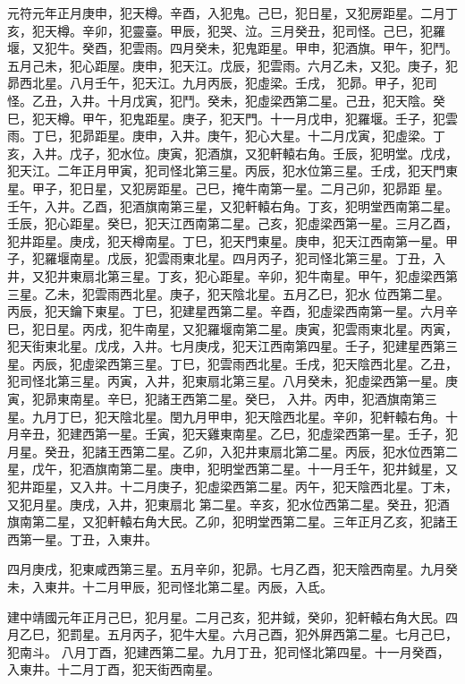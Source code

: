 \begin{pinyinscope}
 元符元年正月庚申，犯天樽。辛酉，入犯鬼。己巳，犯日星，又犯房距星。二月丁亥，犯天樽。辛卯，犯靈臺。甲辰，犯哭、泣。三月癸丑，犯司怪。己巳，犯羅堰，又犯牛。癸酉，犯雲雨。四月癸未，犯鬼距星。甲申，犯酒旗。甲午，犯鬥。五月己未，犯心距屋。庚申，犯天江。戊辰，犯雲雨。六月乙未，又犯。庚子，犯昴西北星。八月壬午，犯天江。九月丙辰，犯虛梁。壬戌，
 犯昴。甲子，犯司怪。乙丑，入井。十月戊寅，犯鬥。癸未，犯虛梁西第二星。己丑，犯天陰。癸巳，犯天樽。甲午，犯鬼距星。庚子，犯天門。十一月戊申，犯羅堰。壬子，犯雲雨。丁巳，犯昴距星。庚申，入井。庚午，犯心大星。十二月戊寅，犯虛梁。丁亥，入井。戊子，犯水位。庚寅，犯酒旗，又犯軒轅右角。壬辰，犯明堂。戊戌，犯天江。二年正月甲寅，犯司怪北第三星。丙辰，犯水位第三星。壬戌，犯天門東星。甲子，犯日星，又犯房距星。己巳，掩牛南第一星。二月己卯，犯昴距
 星。壬午，入井。乙酉，犯酒旗南第三星，又犯軒轅右角。丁亥，犯明堂西南第二星。壬辰，犯心距星。癸巳，犯天江西南第二星。己亥，犯虛梁西第一星。三月乙酉，犯井距星。庚戌，犯天樽南星。丁巳，犯天門東星。庚申，犯天江西南第一星。甲子，犯羅堰南星。戊辰，犯雲雨東北星。四月丙子，犯司怪北第三星。丁丑，入井，又犯井東扇北第三星。丁亥，犯心距星。辛卯，犯牛南星。甲午，犯虛梁西第三星。乙未，犯雲雨西北星。庚子，犯天陰北星。五月乙巳，犯水
 位西第二星。丙辰，犯天鑰下東星。丁巳，犯建星西第二星。辛酉，犯虛梁西南第一星。六月辛巳，犯日星。丙戌，犯牛南星，又犯羅堰南第二星。庚寅，犯雲雨東北星。丙寅，犯天街東北星。戊戌，入井。七月庚戌，犯天江西南第四星。壬子，犯建星西第三星。丙辰，犯虛梁西第三星。丁巳，犯雲雨西北星。壬戌，犯天陰西北星。乙丑，犯司怪北第三星。丙寅，入井，犯東扇北第三星。八月癸未，犯虛梁西第一星。庚寅，犯昴東南星。辛巳，犯諸王西第二星。癸巳，
 入井。丙申，犯酒旗南第三星。九月丁巳，犯天陰北星。閏九月甲申，犯天陰西北星。辛卯，犯軒轅右角。十月辛丑，犯建西第一星。壬寅，犯天雞東南星。乙巳，犯虛梁西第一星。壬子，犯月星。癸丑，犯諸王西第二星。乙卯，入犯井東扇北第二星。丙辰，犯水位西第二星，戊午，犯酒旗南第二星。庚申，犯明堂西第二星。十一月壬午，犯井鉞星，又犯井距星，又入井。十二月庚子，犯虛梁西第二星。丙午，犯天陰西北星。丁未，又犯月星。庚戌，入井，犯東扇北
 第二星。辛亥，犯水位西第二星。癸丑，犯酒旗南第二星，又犯軒轅右角大民。乙卯，犯明堂西第二星。三年正月乙亥，犯諸王西第一星。丁丑，入東井。



 四月庚戌，犯東咸西第三星。五月辛卯，犯昴。七月乙酉，犯天陰西南星。九月癸未，入東井。十二月甲辰，犯司怪北第二星。丙辰，入氐。



 建中靖國元年正月己巳，犯月星。二月己亥，犯井鉞，癸卯，犯軒轅右角大民。四月乙巳，犯罰星。五月丙子，犯牛大星。六月己酉，犯外屏西第二星。七月己巳，犯南斗。
 八月丁酉，犯建西第二星。九月丁丑，犯司怪北第四星。十一月癸酉，入東井。十二月丁酉，犯天街西南星。




\end{pinyinscope}
